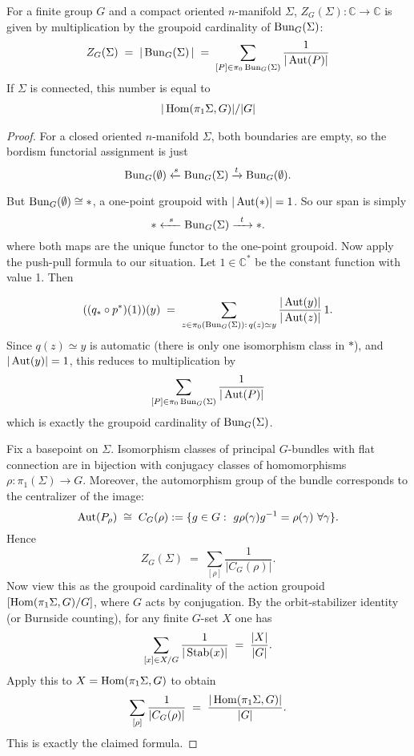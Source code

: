 \documentclass[12pt]{article}
\begin{document}
\begin{proposition}
For a finite group $G$ and a compact oriented $n$-manifold $\Sigma$, $Z_G(\Sigma): \mathbb{C} \to \mathbb{C}$ is given by multiplication by the groupoid cardinality of $\operatorname{Bun}_G(\Sigma)$:
\[
Z_G(\Sigma)\;=\;\left|\,\operatorname{Bun}_G(\Sigma)\,\right|
\;=\;\sum_{[P]\in \pi_0 \operatorname{Bun}_G(\Sigma)} \frac{1}{|\operatorname{Aut}(P)|}
\] 
If $\Sigma$ is connected, this number is equal to
\begin{align*}
    |\operatorname{Hom} (\pi_1\Sigma,G)|/|G|
\end{align*}
\end{proposition}

\begin{proof}
For a closed oriented $n$-manifold $\Sigma$, both boundaries are empty, so the bordism functorial assignment is just
\[
\operatorname{Bun}_G(\emptyset)
\xleftarrow{s}
\operatorname{Bun}_G(\Sigma)
\xrightarrow{t}
\operatorname{Bun}_G(\emptyset).
\]

But $\operatorname{Bun}_G(\emptyset)\cong *$, a one-point groupoid with $|\operatorname{Aut}(*)|=1$. So our span is simply
\[
* \xleftarrow{\;\;s\;\;} \operatorname{Bun}_G(\Sigma) \xrightarrow{\;\;t\;\;} *.
\]
where both maps are the unique functor to the one-point groupoid. Now apply the push-pull formula to our situation. Let $1\in \mathbb{C}^*$ be the constant function with value 1. Then

\[
((q_* \circ p^*)(1))(y)
\;=\;
\sum_{z\in\pi_0(\operatorname{Bun}_G(\Sigma)) :\, q(z)\simeq y}
\frac{|\operatorname{Aut}(y)|}{|\operatorname{Aut}(z)|}\, 1.
\] Since $q(z) \simeq y$ is automatic (there is only one isomorphism class in $*$), and $|\operatorname{Aut}(y)|=1$, this reduces to multiplication by
\[\sum_{[P]\in \pi_0 \operatorname{Bun}_G(\Sigma)} \frac{1}{|\operatorname{Aut}(P)|}\]
which is exactly the groupoid cardinality of $\operatorname{Bun}_G(\Sigma)$.


Fix a basepoint on $\Sigma$. Isomorphism classes of principal $G$-bundles
with flat connection are in bijection with conjugacy classes of homomorphisms
$\rho:\pi_1(\Sigma)\to G$. Moreover, the automorphism group of the bundle
corresponds to the centralizer of the image:
\[
\Aut(P_\rho)\;\cong\;C_G(\rho):= \{g\in G:\ g\rho(\gamma)g^{-1}=\rho(\gamma)\ \forall\gamma\}.
\]
Hence
\[
Z_G(\Sigma)\;=\;\sum_{[\rho]}\frac{1}{|C_G(\rho)|}.
\]
Now view this as the groupoid cardinality of the action groupoid
$[\operatorname{Hom}(\pi_1\Sigma,G)/G]$, where $G$ acts by conjugation.
By the orbit-stabilizer identity (or Burnside counting),
for any finite $G$-set $X$ one has
\[
\sum_{[x]\in X/G}\frac{1}{|\operatorname{Stab}(x)|}\;=\;\frac{|X|}{|G|}.
\]
Apply this to $X=\operatorname{Hom}(\pi_1\Sigma,G)$ to obtain
\[
\sum_{[\rho]}\frac{1}{|C_G(\rho)|}
\;=\;\frac{|\operatorname{Hom}(\pi_1\Sigma,G)|}{|G|}.
\]
This is exactly the claimed formula.
\end{proof}
\end{document}
